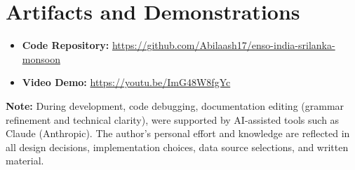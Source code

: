 \documentclass{article}
\begin{document}
\section{Artifacts and Demonstrations}

\begin{itemize}[noitemsep]
    \item \textbf{Code Repository:} \url{https://github.com/Abilaash17/enso-india-srilanka-monsoon} %
    \item \textbf{Video Demo:} \url{https://youtu.be/ImG48W8fgYc} %
\end{itemize}

\textbf{Note:}
During development, code debugging, documentation editing (grammar refinement and technical clarity), were supported by AI-assisted tools such as Claude (Anthropic). The author's personal effort and knowledge are reflected in all design decisions, implementation choices, data source selections, and written material.


\vfill\pagebreak
{\fontsize{8}{9}\selectfont


}
\end{document}
